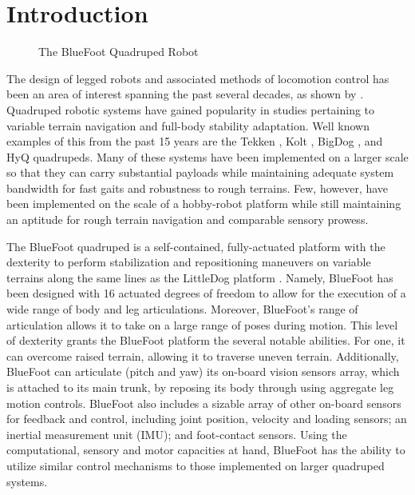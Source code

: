 \chapter{Introduction}
	\label{ch::introduction}
	
	\begin{figure}[h!]
		\centering
		\caption{The BlueFoot Quadruped Robot}
		\label{fig::bluefoot_glamour}
	\end{figure}
		The design of legged robots and associated methods of locomotion control has been an area of interest spanning the past several decades, as shown by \cite{McGhee1965,Hodgins1991,Altendorfer2001,Kolter2008,Wieber2015}. Quadruped robotic systems have gained popularity in studies pertaining to variable terrain navigation and full-body stability adaptation. Well known examples of this from the past 15 years are the Tekken \cite{Fukuoka2003}, Kolt \cite{Estremera2006}, BigDog \cite{BigDog2008}, and HyQ \cite{Semini2010_PHD} quadrupeds. Many of these systems have been implemented on a larger scale so that they can carry substantial payloads while maintaining adequate system bandwidth for fast gaits and robustness to rough terrains. Few, however, have been implemented on the scale of a hobby-robot platform while still maintaining an aptitude for rough terrain navigation and comparable sensory prowess.

		The BlueFoot quadruped is a self-contained, fully-actuated platform with the dexterity to perform stabilization and repositioning maneuvers on variable terrains along the same lines as the LittleDog platform \cite{Rebula2007}. Namely, BlueFoot has been designed with 16 actuated degrees of freedom to allow for the execution of a wide range of body and leg articulations. Moreover, BlueFoot's range of articulation allows it to take on a large range of poses during motion. This level of dexterity grants the BlueFoot platform the several notable abilities. For one, it can overcome raised terrain, allowing it to traverse uneven terrain. Additionally, BlueFoot can articulate (\IE pitch and yaw) its on-board vision sensors array, which is attached to its main trunk, by reposing its body through using aggregate leg motion controls. BlueFoot also includes a sizable array of other on-board sensors for feedback and control, including joint position, velocity and loading sensors; an inertial measurement unit (IMU); and foot-contact sensors. Using the computational, sensory and motor capacities at hand, BlueFoot has the ability to utilize similar control mechanisms to those implemented on larger quadruped systems. 

